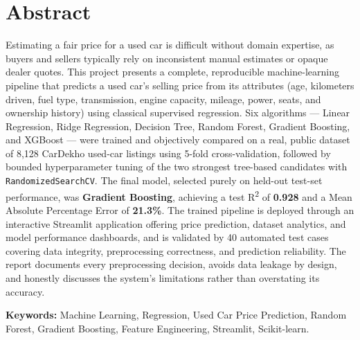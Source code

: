 \documentclass[12pt,a4paper]{report}
\begin{document}
\chapter*{Abstract}
\thispagestyle{empty}
Estimating a fair price for a used car is difficult without domain
expertise, as buyers and sellers typically rely on inconsistent manual
estimates or opaque dealer quotes. This project presents a complete,
reproducible machine-learning pipeline that predicts a used car's selling
price from its attributes (age, kilometers driven, fuel type,
transmission, engine capacity, mileage, power, seats, and ownership
history) using classical supervised regression. Six algorithms --- Linear
Regression, Ridge Regression, Decision Tree, Random Forest, Gradient
Boosting, and XGBoost --- were trained and objectively compared on a real,
public dataset of 8,128 CarDekho used-car listings using 5-fold
cross-validation, followed by bounded hyperparameter tuning of the two
strongest tree-based candidates with \texttt{RandomizedSearchCV}. The
final model, selected purely on held-out test-set performance, was
\textbf{Gradient Boosting}, achieving a test R\textsuperscript{2} of
\textbf{0.928} and a Mean Absolute Percentage Error of \textbf{21.3\%}.
The trained pipeline is deployed through an interactive Streamlit
application offering price prediction, dataset analytics, and model
performance dashboards, and is validated by 40 automated test cases
covering data integrity, preprocessing correctness, and prediction
reliability. The report documents every preprocessing decision, avoids
data leakage by design, and honestly discusses the system's limitations
rather than overstating its accuracy.

\textbf{Keywords:} Machine Learning, Regression, Used Car Price
Prediction, Random Forest, Gradient Boosting, Feature Engineering,
Streamlit, Scikit-learn.

\begingroup\footnotesize
\makeatletter
\renewcommand\l@chapter[2]{%
  \ifnum \c@tocdepth >\m@ne
    \vskip 0.18em \@plus\p@
    \setlength\@tempdima{1.5em}%
    \begingroup
      \parindent \z@ \rightskip \@pnumwidth \parfillskip -\@pnumwidth
      \leavevmode \bfseries
      \advance\leftskip\@tempdima \hskip -\leftskip
      #1\nobreak\hfil \nobreak\hb@xt@\@pnumwidth{\hss #2}\par
    \endgroup
  \fi}
\end{document}

